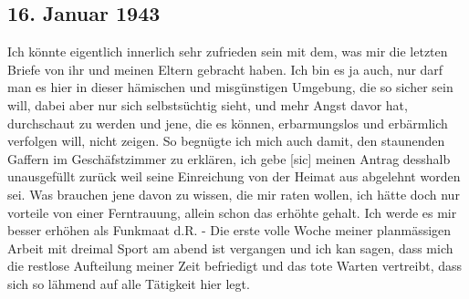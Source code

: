 \subsection{16. Januar 1943}

Ich k\"{o}nnte eigentlich innerlich sehr zufrieden sein mit dem, was mir die letzten Briefe von ihr und meinen Eltern gebracht haben.
Ich bin es ja auch, nur darf man es hier in dieser h\"{a}mischen und misg\"{u}nstigen Umgebung, die so sicher sein will, dabei aber nur sich selbsts\"{u}chtig sieht, und mehr Angst davor hat, durchschaut zu werden und jene, die es k\"{o}nnen, erbarmungslos und erb\"{a}rmlich verfolgen will, nicht zeigen.
So begn\"{u}gte ich mich auch damit, den staunenden Gaffern im Gesch\"{a}fstzimmer zu erkl\"{a}ren, ich gebe{\color{red} [sic] } meinen Antrag desshalb unausgef\"{u}llt zur\"{u}ck weil seine Einreichung von der Heimat aus abgelehnt worden sei.
Was brauchen jene davon zu wissen, die mir raten wollen, ich h\"{a}tte doch nur vorteile von einer Ferntrauung, allein schon das erh\"{o}hte gehalt.
Ich werde es mir besser erh\"{o}hen als Funkmaat d.R.
- Die erste volle Woche meiner planm\"{a}ssigen Arbeit mit dreimal Sport am abend ist vergangen und ich kan sagen, dass mich die restlose Aufteilung meiner Zeit befriedigt und das tote Warten vertreibt, dass sich so l\"{a}hmend auf alle T\"{a}tigkeit hier legt.

\clearpage
